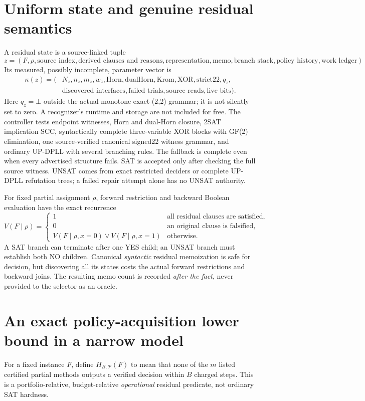 \documentclass[10pt]{article}
\begin{document}
\section{Uniform state and genuine residual semantics}
A residual state is a source-linked tuple
\[
z=(F,\rho,\text{source index},\text{derived clauses and reasons},\text{representation},
\text{memo},\text{branch stack},\text{policy history},\text{work ledger}).
\]
Its measured, possibly incomplete, parameter vector is
\[
\begin{aligned}
\kappa(z)=(&N_z,n_z,m_z,w_z,\mathrm{Horn},\mathrm{dualHorn},\mathrm{Krom},\mathrm{XOR},\mathrm{strict22},q_z,\\
&\text{discovered interfaces},\text{failed trials},\text{source reads},\text{live bits}).
\end{aligned}
\]
Here $q_z=\bot$ outside the actual monotone exact-(2,2) grammar; it is not silently set to zero. A recognizer's runtime and storage are not included for free. The controller tests endpoint witnesses, Horn and dual-Horn closure, 2SAT implication SCC, syntactically complete three-variable XOR blocks with GF(2) elimination, one source-verified canonical signed22 witness grammar, and ordinary UP-DPLL with several branching rules. The fallback is complete even when every advertised structure fails. SAT is accepted only after checking the full source witness. UNSAT comes from exact restricted deciders or complete UP-DPLL refutation trees; a failed repair attempt alone has no UNSAT authority.

For fixed partial assignment $\rho$, forward restriction and backward Boolean evaluation have the exact recurrence
\[
V(F\mid\rho)=\begin{cases}
1&\text{all residual clauses are satisfied},\\
0&\text{an original clause is falsified},\\
V(F\mid\rho,x=0)\vee V(F\mid\rho,x=1)&\text{otherwise}.
\end{cases}
\]
A SAT branch can terminate after one YES child; an UNSAT branch must establish both NO children. Canonical \emph{syntactic} residual memoization is safe for decision, but discovering all its states costs the actual forward restrictions and backward joins. The resulting memo count is recorded \emph{after the fact}, never provided to the selector as an oracle.

\section{An exact policy-acquisition lower bound in a narrow model}
For a fixed instance $F$, define $H_{B,\mathcal{P}}(F)$ to mean that none of the $m$ listed certified partial methods outputs a verified decision within $B$ charged steps. This is a portfolio-relative, budget-relative \emph{operational} residual predicate, not ordinary SAT hardness.
\end{document}
